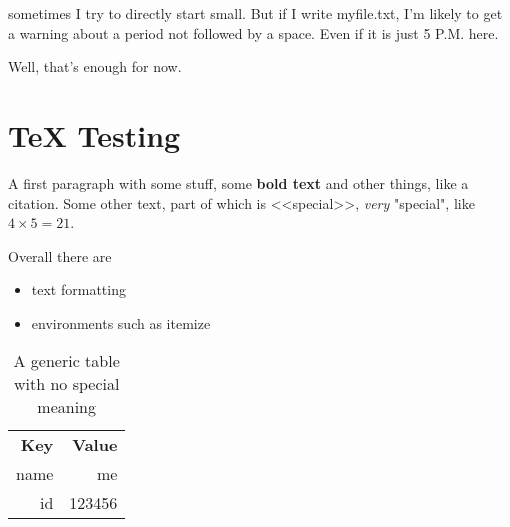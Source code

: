 \documentclass{scrartcl}
\begin{document}
sometimes I try to directly start small. But if I write myfile.txt, I'm likely to get a warning about a period not followed by a space. Even if it is just 5 P.M. here.

Well, that's enough for now.





\section{TeX Testing}\label{sec:texsection}
A first paragraph with some stuff, some \textbf{bold text}   and other things, like a citation\cite{my:paper}.
Some other text, part of which is <<special>>, \emph{very} "special", like $4 \times 5 = 21$.

Overall there are 
\begin{itemize}
	\item text formatting
	\item environments such as itemize
\end{itemize}


\begin{table}
	\centering
    \begin{tabular}{@{}rr@{}} 
    \textbf{Key}  & \textbf{Value} \\ 
    name & me \\
    id & 123456\\
    \end{tabular}
    \caption{A generic table with no special meaning}
    \label{tab:example}
\end{table}
\end{document}
